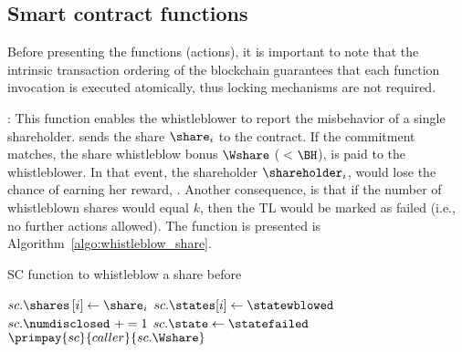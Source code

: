 \subsection{Smart contract functions}\label{sect:sc_functions}

Before presenting the functions (actions), it is important to note that the intrinsic transaction ordering of the blockchain guarantees that each function invocation is executed atomically, thus locking mechanisms are not required.


\smallskip
\texttt{\algowhistleblowshare}:
This function enables the whistleblower to report the misbehavior of a single shareholder.
\whistleblower sends the share $\share_{i}$ to the contract.
If the commitment matches, the share whistleblow bonus $\Wshare$ ($<$$\BH$), is paid to the whistleblower.
In that event, the shareholder $\shareholder_{i}$, would lose the chance of earning her reward, \RH.
Another consequence, is that if the number of whistleblown shares would equal $k$, then the TL would be marked as failed (i.e., no further actions allowed).
The function is presented is Algorithm~\ref{algo:whistleblow_share}.

\begin{algorithm}[t]
	\caption{SC function to whistleblow a share before \td}\label{algo:whistleblow_share}
	\begin{algorithmic}[1]
		\vspace{0.6em}
		\State $sc.\shares \left[ i \right] \gets \share_{i}$
		\State $sc.\states[i]\gets \statewblowed$
		\State $sc.\numdisclosed\ += 1$
		\State $sc.\state\gets \statefailed$
		\EndIf
		\State $\primpay{sc}{caller}{sc.\Wshare}$
		\EndIf
		\EndIf
		\EndIf
		\EndProcedure
	\end{algorithmic}
\end{algorithm}


